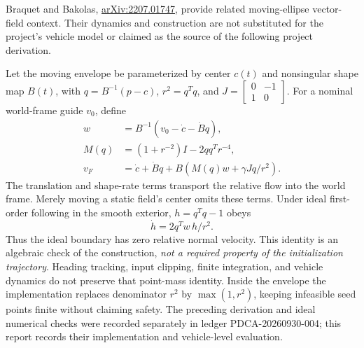 \documentclass[11pt]{article}
\begin{document}
Braquet and Bakolas, \href{https://arxiv.org/abs/2207.01747}{arXiv:2207.01747},
provide related moving-ellipse vector-field context. Their dynamics and
construction are not substituted for the project's vehicle model or claimed
as the source of the following project derivation.

Let the moving envelope be parameterized by center $c(t)$ and nonsingular
shape map $B(t)$, with $q=B^{-1}(p-c)$, $r^2=q^Tq$, and
$J=\left[\begin{smallmatrix}0&-1\\1&0\end{smallmatrix}\right]$.
For a nominal world-frame guide $v_0$, define
\begin{align}
w &= B^{-1}(v_0-\dot c-\dot Bq),\\
M(q)&=(1+r^{-2})I-2qq^Tr^{-4},\\
v_F&=\dot c+\dot Bq+B\left(M(q)w+\gamma Jq/r^2\right).
\end{align}
The translation and shape-rate terms transport the relative flow into the
world frame. Merely moving a static field's center omits these terms. Under
ideal first-order following in the smooth exterior, $h=q^Tq-1$ obeys
\[
\dot h=2q^Tw\,h/r^2.
\]
Thus the ideal boundary has zero relative normal velocity. This identity is
an algebraic check of the construction, \emph{not a required property of the
initialization trajectory}. Heading tracking, input clipping, finite
integration, and vehicle dynamics do not preserve that point-mass identity.
Inside the envelope the implementation replaces denominator $r^2$ by
$\max(1,r^2)$, keeping infeasible seed points finite without claiming safety.
The preceding derivation and ideal numerical checks were recorded separately
in ledger PDCA-20260930-004; this report records their implementation and
vehicle-level evaluation.
\end{document}

